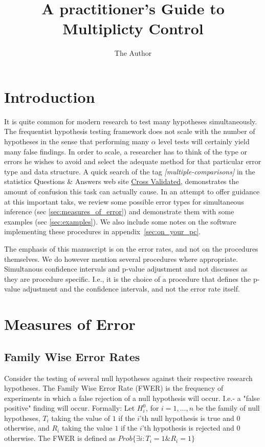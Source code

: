 \documentclass[draft,12pt]{article}
\title{A practitioner's Guide to Multiplicty Control}
\author{The Author}
\date{}                                           %
\begin{document}
\maketitle


\section{Introduction}

It is quite common for modern research to test many hypotheses simultaneously. The frequentist hypothesis testing framework does not scale with the number of hypotheses in the sense that performing many $\alpha$ level tests will certainly yield many false findings. In order to scale, a researcher has to think of the type or errors he wishes to avoid and select the adequate method for that particular error type and data structure. A quick search of the tag \emph{[multiple-comparisons]} in the statistics Questions \& Answers web site \href{http://stats.stackexchange.com}{Cross Validated}, demonstrates the amount of confusion this task can actually cause. In an attempt to offer guidance at this important taks, we review some possible error types for simultaneous inference (sec \ref{sec:measures_of_error}) and demonstrate them with some examples (sec \ref{sec:examples}). We also include some notes on the software implementing these procedures in appendix~\ref{sec:on_your_pc}.

The emphasis of this manuscript is on the error rates, and not on the procedures themselves. We do however mention several procedures where appropriate.  Simultanous confidence intervals and p-value adjustment and not discusses as they are procedure specific. I.e., it is the choice of a procedure that defines the p-value adjustment and the confidence intervals, and not the error rate itself.


\section{\label{sec:measures_of_error}Measures of Error}

\subsection{Family Wise Error Rates}
Consider the testing of several null hypotheses against their respective research hypotheses. The Family Wise Error Rate (FWER) is the frequency of experiments in which a false rejection of a null hypothesis will occur. I.e.- a "false positive" finding will occur.
Formally: Let $H^0_i$, for $i=1,\ldots,n$ be the family of null hypotheses, $T_i$ taking the value of $1$ if the $i$'th null hypothesis is true and 0 otherwise,  and $R_i$ taking the value $1$ if the $i$'th hypothesis is rejected and 0 otherwise.
The FWER is defined as $Prob\{\exists i:T_i=1 \& R_i=1  \}$
\end{document}
